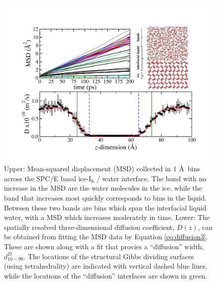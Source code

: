 \begin{figure}
\includegraphics[width=\linewidth]{Figures/DzSPCE}
\caption{\label{fig:DzSPCE} Upper: Mean-squared displacement (MSD)
  collected in 1 \AA~bins across the SPC/E basal ice-I$_\mathrm{h}$ /
  water interface. The band with no increase in the MSD are the water
  molecules in the ice, while the band that increases most quickly
  corresponds to bins in the liquid. Between these two bands are bins
  which span the interfacial liquid water, with a MSD which increases
  moderately in time. Lower: The spatially resolved three-dimensional
  diffusion coefficient, $D(z)$, can be obtained from fitting the MSD
  data by Equation \eqref{eq:diffusion3}. These are shown along with a fit
  that provies a ``diffusion'' width, $d_{10-90}^{D}$. The locations
  of the structural Gibbs dividing surfaces (using tetrahedrality) are
  indicated with vertical dashed blue lines, while the locations of
  the ``diffusion'' interfaces are shown in green.  }
\end{figure}

